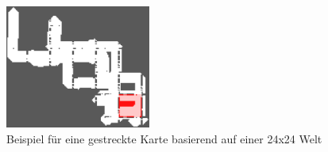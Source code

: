 \begin{figure}
	\includegraphics[width=180px]{bilder/karte3.png}
	\centering
	\caption{Beispiel für eine gestreckte Karte basierend auf einer 24x24 Welt }
	\label{fig:kartenwiederholung}
\end{figure}




	



